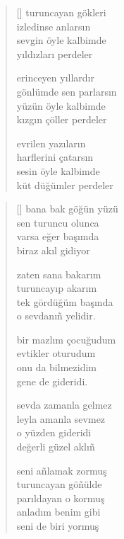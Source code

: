 \documentclass[10pt, openright, twoside]{memoir}
\theoremstyle{definition}
\begin{document}
\vspace*{\fill}
%
\newpage
{}
\vspace*{\fill}
\settowidth{\versewidth}{gönlümde sen parlarsın}
\begin{verse}[\versewidth]
  turuncayan gökleri \\
  izledinse anlarsın \\
  sevgin öyle kalbimde \\
  yıldızları perdeler

  erinceyen yıllardır \\
  gönlümde sen parlarsın \\
  yüzün öyle kalbimde \\
  kızgın çöller perdeler

  evrilen yazıların \\
  harflerini çatarsın \\
  sesin öyle kalbimde \\
  küt düğümler perdeler
\end{verse}
\vspace*{\fill}
%
\newpage
{}
\vspace*{\fill}
\settowidth{\versewidth}{o sevdanı\~n yelidir.}
\begin{verse}[\versewidth]
  bana bak göğün yüzü \\
  sen turuncu olunca \\
  varsa eğer başımda \\
  biraz akıl gidiyor

  zaten sana bakarım \\
  turuncayıp akarım \\
  tek gördüğüm başında \\
  o sevdanı\~n yelidir.

  bir mazlım çocuğudum \\
  evtikler oturudum \\
  onu da bilmezidim \\
  gene de gideridi.

  sevda zamanla gelmez \\
  leyla amanla sevmez \\
  o yüzden gideridi \\
  değerli güzel aklı\~n

  seni a\~nlamak zormuş \\
  turuncayan gö\~nülde \\
  parıldayan o kormuş \\
  anladım benim gibi \\
  seni de biri yormuş
\end{verse}
\end{document}
